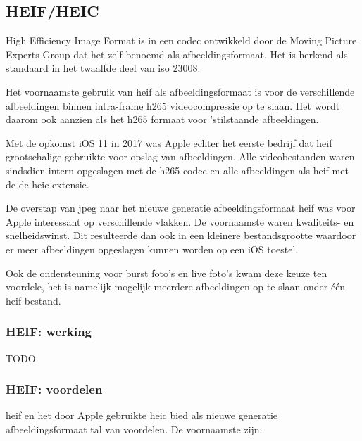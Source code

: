\subsection{HEIF/HEIC}
\label{sec:afbeeldingscompressie-heif}

High Efficiency Image Format is in een \gls{codec} ontwikkeld door de Moving Picture Experts Group dat het zelf benoemd als \gls{afbeeldingsformaat}. Het is herkend als standaard in het twaalfde deel van \gls{iso} 23008.

Het voornaamste gebruik van \gls{heif} als \gls{afbeeldingsformaat} is voor de verschillende afbeeldingen binnen \gls{intra-frame} \gls{h265} \gls{videocompressie} op te slaan. Het wordt daarom ook aanzien als het \gls{h265} formaat voor 'stilstaande afbeeldingen.

Met de opkomst iOS 11 in 2017 was Apple echter het eerste bedrijf dat \gls{heif} grootschalige gebruikte voor opslag van afbeeldingen. Alle videobestanden waren sindsdien intern opgeslagen met de \gls{h265} \gls{codec} en alle afbeeldingen als \gls{heif} met de de \gls{heic} \gls{extensie}. 

De overstap van \gls{jpeg} naar het nieuwe generatie \gls{afbeeldingsformaat} \gls{heif} was voor Apple interessant op verschillende vlakken. De voornaamste waren kwaliteits- en snelheidswinst. Dit resulteerde dan ook in een kleinere bestandsgrootte waardoor er meer afbeeldingen opgeslagen kunnen worden op een iOS toestel.

Ook de ondersteuning voor burst foto's en live foto's kwam deze keuze ten voordele, het is namelijk mogelijk meerdere afbeeldingen op te slaan onder één \gls{heif} bestand.

\subsubsection{HEIF: werking}
\label{sec:afbeeldingscompressie-heif-werking}

TODO


\subsubsection{HEIF: voordelen}
\label{sec:afbeeldingscompressie-heif-voordelen}

\Gls{heif} en het door Apple gebruikte \gls{heic} bied als nieuwe generatie \gls{afbeeldingsformaat} tal van voordelen. De voornaamste zijn: 

